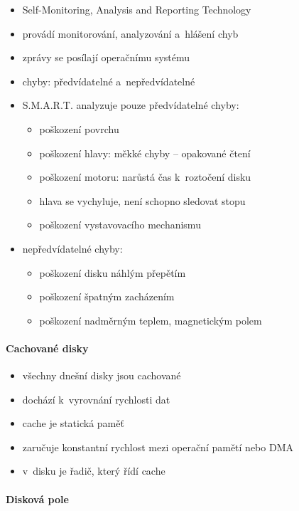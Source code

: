 \documentclass[a4paper,12pt]{article}
\providecommand{\tightlist}{%
\setlength{\itemsep}{0pt}\setlength{\parskip}{0pt}}
\begin{document}
\begin{itemize}
\tightlist
\item Self-Monitoring, Analysis and Reporting Technology
\item provádí monitorování, analyzování a~hlášení chyb
\item zprávy se posílají operačnímu systému
\item chyby: předvídatelné a~nepředvídatelné
\item S.M.A.R.T. analyzuje pouze předvídatelné chyby:

  \begin{itemize}
  \tightlist
  \item poškození povrchu
  \item poškození hlavy: měkké chyby -- opakované čtení
  \item poškození motoru: narůstá čas k~roztočení disku
  \item hlava se vychyluje, není schopno sledovat stopu
  \item poškození vystavovacího mechanismu
  \end{itemize}
\item nepředvídatelné chyby:

  \begin{itemize}
  \tightlist
  \item poškození disku náhlým přepětím
  \item poškození špatným zacházením
  \item poškození nadměrným teplem, magnetickým polem
  \end{itemize}
\end{itemize}

\paragraph{Cachované disky}

\begin{itemize}
\tightlist
\item všechny dnešní disky jsou cachované
\item dochází k~vyrovnání rychlosti dat
\item cache je statická paměť
\item zaručuje konstantní rychlost mezi operační pamětí nebo DMA
\item v~disku je řadič, který řídí cache
\end{itemize}

\paragraph{Disková pole}
\end{document}
